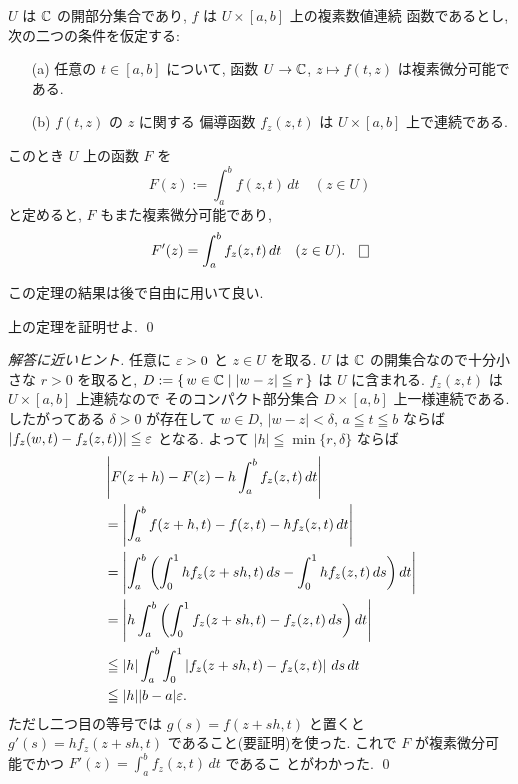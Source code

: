 \documentclass[12pt,twoside]{jarticle}
\begin{document}
\begin{theorem}[積分記号下での複素微分]
 $U$ は ${\mathbb C}$ の開部分集合であり, $f$ は $U\times [a,b]$ 上の複素数値連続
 函数であるとし, 次の二つの条件を仮定する:
 \begin{enumerate}
 \item[(a)] 任意の $t\in [a,b]$ について, 
  函数 $U\to{\mathbb C}$, $z\mapsto f(t,z)$ は複素微分可能である.
 \item[(b)] $f(t,z)$ の $z$ に関する
  偏導函数 $f_z(z,t)$ は $U\times [a,b]$ 上で連続である.
 \end{enumerate}
 このとき $U$ 上の函数 $F$ を
 \begin{equation*}
  F(z) := \int_a^b f(z,t)\,dt \quad (z\in U)
 \end{equation*}
 と定めると, $F$ もまた複素微分可能であり,
 \begin{equation*}
  F'(z) = \int_a^b f_z(z,t)\,dt \quad (z\in U).
  \qed
 \end{equation*}
\end{theorem}

この定理の結果は後で自由に用いて良い.

\begin{question}
 上の定理を証明せよ. \qed
\end{question}

\begin{proof}[解答に近いヒント]
 任意に $\varepsilon>0$ と $z\in U$ を取る.
 $U$ は ${\mathbb C}$ の開集合なので十分小さな $r>0$ を取ると, %
 $D:=\{\,w\in{\mathbb C}\mid |w-z|\leqq r\,\}$ は $U$ に含まれる.
 $f_z(z,t)$ は $U\times[a,b]$ 上連続なので
 そのコンパクト部分集合 $D\times[a,b]$ 上一様連続である.
 したがってある $\delta>0$ が存在して %
 $w\in D$, $|w-z|<\delta$, $a\leqq t\leqq b$ ならば %
 $|f_z(w,t)-f_z(z,t))|\leqq\varepsilon$ となる.
 よって $|h|\leqq\min\{r,\delta\}$ ならば
 \begin{align*}
  &
  \left|
   F(z+h) - F(z) - h\int_a^b f_z(z,t)\,dt
  \right|
  \\ &
  =
  \left|
   \int_a^b f(z+h,t) - f(z,t) - h f_z(z,t) \,dt
  \right|
  \\ &
  =
  \left|
   \int_a^b 
   \left(
    \int_0^1 h f_z(z+sh,t)\,ds  - \int_0^1 h f_z(z,t)\,ds
   \right)
   dt
  \right|
  \\ &
  =
  \left|
   h
   \int_a^b 
   \left(
    \int_0^1 f_z(z+sh,t) - f_z(z,t)\,ds
   \right)
   dt
  \right|
  \\ &
  \leqq
   |h|
   \int_a^b 
    \int_0^1 
    \left|
    f_z(z+sh,t) - f_z(z,t)
    \right|
   \,ds
   \,dt
  \\ &
  \leqq 
  |h||b-a|\varepsilon.
 \end{align*}
 ただし二つ目の等号では $g(s)=f(z+sh,t)$ と置くと $g'(s)=h f_z(z+sh,t)$ 
 であること(要証明)を使った.
 これで $F$ が複素微分可能でかつ $F'(z)=\int_a^b f_z(z,t)\,dt$ であるこ
 とがわかった.
 \qed
\end{proof}
\end{document}
